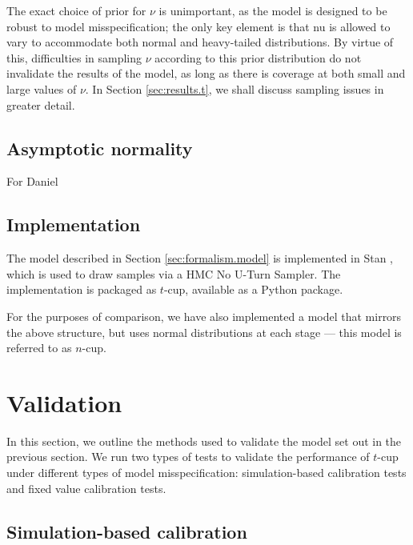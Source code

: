 \documentclass[fleqn,usenatbib]{mnras}
\begin{document}
The exact choice of prior for $\nu$ is unimportant, as the model is designed to
be robust to model misspecification; the only key element is that nu is allowed
to vary to accommodate both normal and heavy-tailed distributions. By virtue of
this, difficulties in sampling $\nu$ according to this prior distribution do not
invalidate the results of the model, as long as there is coverage at both small
and large values of $\nu$. In Section \ref{sec:results.t}, we shall discuss sampling issues in
greater detail.

\subsection{Asymptotic normality}
\label{sec:formalism.asymptotic}

{\color{green} For Daniel}

\subsection{Implementation}
\label{sec:formalism.implementation}

The model described in Section \ref{sec:formalism.model} is implemented in Stan
\citep{Stan}, which is used to draw samples via a HMC No U-Turn Sampler. The
implementation is packaged as $t$-cup, available as a Python
package\footnotemark.

For the purposes of comparison, we have also implemented a model that mirrors
the above structure, but uses normal distributions at each stage --- this model
is referred to as $n$-cup.


\section{Validation}
\label{sec:methods}

In this section, we outline the methods used to validate the model set out in
the previous section. We run two types of tests to validate the performance of
$t$-cup under different types of model misspecification: simulation-based
calibration tests \citep{Cook:2006, Talts:2018} and fixed value calibration
tests.

\subsection{Simulation-based calibration}
\label{sec:methods.sbc}
\end{document}
